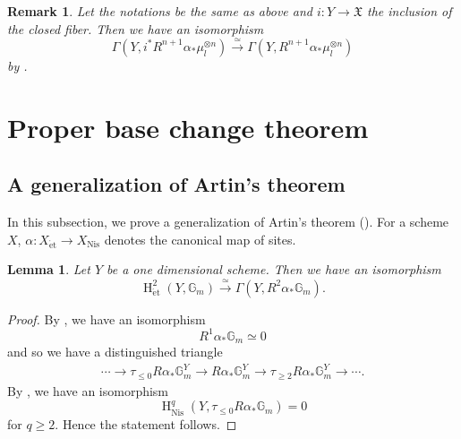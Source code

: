 \documentclass{article}
\newtheorem{lem}[thm]{\indent \sc Lemma}
\newtheorem{rem}[thm]{\indent \sc Remark}
\newcommand{\et}{\mathrm{\acute{e}t}}
\newcommand{\Nis}{\mathrm{Nis}}
\newcommand{\HO}{\operatorname{H}}
\begin{document}
%
\begin{rem}\upshape\label{comia}
Let the notations be the same as above and
$i: Y\to \mathfrak{X}$
the inclusion of the closed fiber. Then we have an isomorphism
%
\begin{equation*}
\Gamma\left(
Y,
i^{*}R^{n+1}\alpha_{*}\mu^{\otimes n}_{l}
\right)
\xrightarrow{\simeq}
\Gamma\left(
Y,
R^{n+1}\alpha_{*}\mu^{\otimes n}_{l}
\right)
\end{equation*}
%
by \cite[p.776, Proposition 2.2.b)]{Ge}.
\end{rem}
%

\section{Proper base change theorem}\label{TPrb}

%
\subsection{A generalization of Artin's theorem}

In this subsection, we prove a generalization of Artin's theorem (\cite[p.98, Th\'{e}or\`{e}me (3.1)]{Gr}).
For a scheme $X$, $\alpha: X_{\et}\to X_{\Nis}$ denotes the canonical map of sites.

%
\begin{lem}\upshape\label{1BUis}
Let $Y$ be a one dimensional scheme. Then we have an isomorphism
%
\begin{equation*}
\HO^{2}_{\et}(
Y, \mathbb{G}_{m}
)
\xrightarrow{\simeq}
\Gamma\left(
Y,
R^{2}\alpha_{*}\mathbb{G}_{m}
\right).
\end{equation*}
%
\end{lem}
%

%
\begin{proof}\upshape
By \cite[p.124, III, Proposition 4.9]{M}, we have an isomorphism
%
\begin{equation*}
R^{1}\alpha_{*}\mathbb{G}_{m}
\simeq 
0
\end{equation*}
%
and so we have a distinguished triangle
%
\begin{align*}
\cdots 
\to
\tau_{\leq 0}R\alpha_{*}\mathbb{G}_{m}^{Y}
\to
R\alpha_{*}\mathbb{G}_{m}^{Y}
\to
\tau_{\geq 2}R\alpha_{*}\mathbb{G}_{m}^{Y}
\to\cdots.
\end{align*}
%
By \cite[pp.279--280, 1.32. Theorem]{Ni}, 
we have an isomorphism
%
\begin{equation*}
\HO^{q}_{\Nis}(
Y, 
\tau_{\leq 0}R\alpha_{*}\mathbb{G}_{m}
)    
=0
\end{equation*}
%
for $q\geq 2$. Hence the statement follows.
\end{proof}
%
\end{document}
